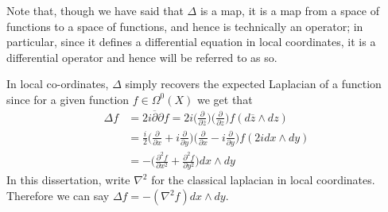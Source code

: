 \documentclass[11pt]{report}
\theoremstyle{definition}
\begin{document}
Note that, though we have said that $\Delta$ is a map, it is a map from a space of functions to a space of functions, and hence is technically an operator; in particular, since it defines a differential equation in local coordinates, it is a differential operator and hence will be referred to as so. 

In local co-ordinates, $\Delta$ simply recovers the expected Laplacian of a function since for a given function $f\in \Omega^0(X)$ we get that 
\begin{align*}
  \Delta f &= 2i\overline{\partial }\partial f = 2i\Big(\frac{\partial}{\partial\overline{z}}\Big)\Big(\frac{\partial}{\partial z}\Big)f(d\overline{z}\wedge dz) \\
  &=\frac{i}{2}\Big(\frac{\partial}{\partial x} + i\frac{\partial}{\partial y}\Big)\Big(\frac{\partial}{\partial x} - i\frac{\partial}{\partial y}\Big)f(2idx\wedge dy) \\
  &= -\Big(\frac{\partial^2 f}{\partial x^2} + \frac{\partial^2 f}{\partial y^2}\Big)dx\wedge dy 
\end{align*}
In this dissertation, write $\nabla^2$ for the classical laplacian in local coordinates. Therefore we can say $\Delta f = -(\nabla^2 f) dx\wedge dy$.
\end{document}
